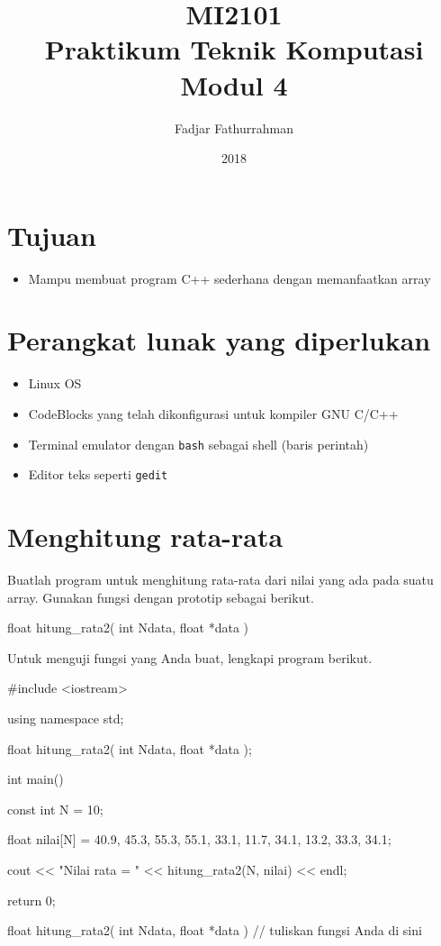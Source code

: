 \documentclass[a4paper,11pt]{extarticle}
\title{
MI2101\\
Praktikum Teknik Komputasi\\
Modul 4}
\author{Fadjar Fathurrahman}
\date{2018}
\begin{document}
\maketitle

\section{Tujuan}
\begin{itemize}
\item Mampu membuat program C++ sederhana dengan memanfaatkan array
\end{itemize}

\section{Perangkat lunak yang diperlukan}
\begin{itemize}
\item Linux OS
\item CodeBlocks yang telah dikonfigurasi untuk kompiler GNU C/C++
\item Terminal emulator dengan \texttt{bash} sebagai shell (baris perintah)
\item Editor teks seperti \texttt{gedit}
\end{itemize}

\section{Menghitung rata-rata}

Buatlah program untuk menghitung rata-rata dari nilai yang ada pada
suatu array. Gunakan fungsi dengan prototip sebagai berikut.
\begin{cppcode}
float hitung_rata2( int Ndata, float *data )
\end{cppcode}

Untuk menguji fungsi yang Anda buat, lengkapi program berikut.
\begin{cppcode}
#include <iostream>

using namespace std;

float hitung_rata2( int Ndata, float *data );

int main()
{
  const int N = 10;

  float nilai[N] = {40.9, 45.3, 55.3, 55.1, 33.1,
                    11.7, 34.1, 13.2, 33.3, 34.1};
  
  cout << "Nilai rata = " << hitung_rata2(N, nilai) << endl;

  return 0;
}

float hitung_rata2( int Ndata, float *data )
{
  // tuliskan fungsi Anda di sini
}
\end{cppcode}
\end{document}
